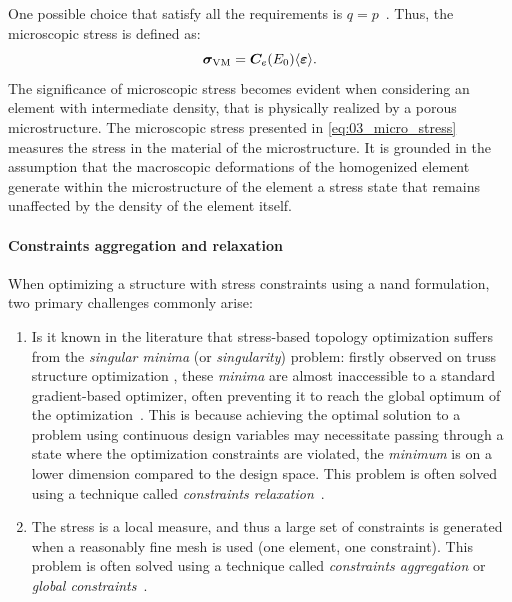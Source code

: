 One possible choice that satisfy all the requirements is $q=p$~. Thus, the microscopic stress is defined as:
\begin{equation}
    \bm{\sigma}_{\text{VM}} = \bm{C}_e(E_0)\langle \bm{\varepsilon} \rangle.
    \label{eq:03_micro_stress}
\end{equation}
The significance of microscopic stress becomes evident when considering an element with intermediate density, that is physically realized by a porous microstructure. The microscopic stress presented in \eqref{eq:03_micro_stress} measures the stress in the material of the microstructure. It is grounded in the assumption that the macroscopic deformations of the homogenized element generate within the microstructure of the element a stress state that remains unaffected by the density of the element itself.

\paragraph{Constraints aggregation and relaxation}
When optimizing a structure with stress constraints using a \gls{nand} formulation, two primary challenges commonly arise:
\begin{enumerate}[label=(\roman*)]
    \item Is it known in the literature  that stress-based topology optimization suffers from the \textit{singular minima} (or \textit{singularity}) problem: firstly observed on truss structure optimization , these \textit{minima} are almost inaccessible to a standard gradient-based optimizer, often preventing it to reach the global optimum of the optimization~\cite{rozvany_design-dependent_2001}. This is because achieving the optimal solution to a problem using continuous design variables may necessitate passing through a state where the optimization constraints are violated, \ie the \textit{minimum} is on a lower dimension compared to the design space. This problem is often solved using a technique called \textit{constraints relaxation}~.
    \item The stress is a local measure, and thus a large set of constraints is generated when a reasonably fine mesh is used (one element, one constraint). This problem is often solved using a technique called \textit{constraints aggregation} or \textit{global constraints}~.
\end{enumerate} 

